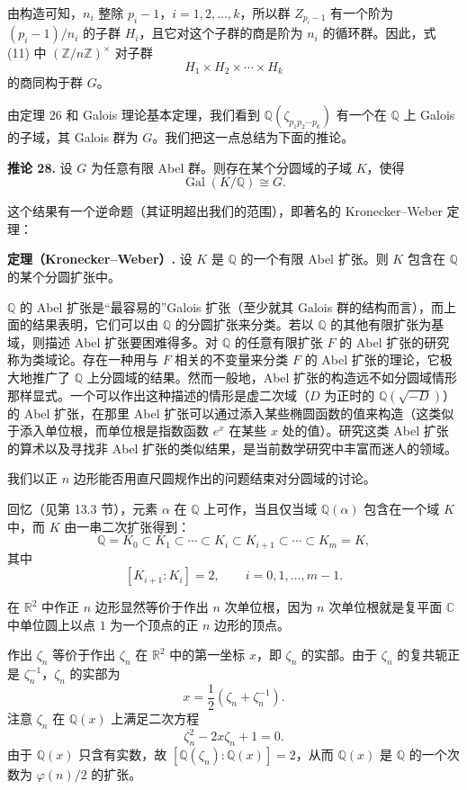 由构造可知，$n_i$ 整除 $p_i-1$，$i=1,2,\ldots,k$，所以群 $Z_{p_i-1}$ 有一个阶为 $(p_i-1)/n_i$ 的子群 $H_i$，且它对这个子群的商是阶为 $n_i$ 的循环群。因此，式 (11) 中 $(\mathbb Z/n\mathbb Z)^\times$ 对子群
\[
H_1\times H_2\times\cdots\times H_k
\]
的商同构于群 $G$。

由定理 26 和 Galois 理论基本定理，我们看到 $\mathbb Q(\zeta_{p_1p_2\cdots p_k})$ 有一个在 $\mathbb Q$ 上 Galois 的子域，其 Galois 群为 $G$。我们把这一点总结为下面的推论。

\noindent\textbf{推论 28.} 设 $G$ 为任意有限 Abel 群。则存在某个分圆域的子域 $K$，使得
\[
\operatorname{Gal}(K/\mathbb Q)\cong G.
\]

这个结果有一个逆命题（其证明超出我们的范围），即著名的 Kronecker--Weber 定理：

\noindent\textbf{定理（Kronecker--Weber）.} 设 $K$ 是 $\mathbb Q$ 的一个有限 Abel 扩张。则 $K$ 包含在 $\mathbb Q$ 的某个分圆扩张中。

$\mathbb Q$ 的 Abel 扩张是“最容易的”Galois 扩张（至少就其 Galois 群的结构而言），而上面的结果表明，它们可以由 $\mathbb Q$ 的分圆扩张来分类。若以 $\mathbb Q$ 的其他有限扩张为基域，则描述 Abel 扩张要困难得多。对 $\mathbb Q$ 的任意有限扩张 $F$ 的 Abel 扩张的研究称为类域论。存在一种用与 $F$ 相关的不变量来分类 $F$ 的 Abel 扩张的理论，它极大地推广了 $\mathbb Q$ 上分圆域的结果。然而一般地，Abel 扩张的构造远不如分圆域情形那样显式。一个可以作出这种描述的情形是虚二次域（$D$ 为正时的 $\mathbb Q(\sqrt{-D})$）的 Abel 扩张，在那里 Abel 扩张可以通过添入某些椭圆函数的值来构造（这类似于添入单位根，而单位根是指数函数 $e^x$ 在某些 $x$ 处的值）。研究这类 Abel 扩张的算术以及寻找非 Abel 扩张的类似结果，是当前数学研究中丰富而迷人的领域。

我们以正 $n$ 边形能否用直尺圆规作出的问题结束对分圆域的讨论。

回忆（见第 13.3 节），元素 $\alpha$ 在 $\mathbb Q$ 上可作，当且仅当域 $\mathbb Q(\alpha)$ 包含在一个域 $K$ 中，而 $K$ 由一串二次扩张得到：
\[
\mathbb Q=K_0\subset K_1\subset\cdots\subset K_i\subset K_{i+1}\subset\cdots\subset K_m=K, \tag{14.12}
\]
其中
\[
[K_{i+1}:K_i]=2,
\qquad i=0,1,\ldots,m-1.
\]

在 $\mathbb R^2$ 中作正 $n$ 边形显然等价于作出 $n$ 次单位根，因为 $n$ 次单位根就是复平面 $\mathbb C$ 中单位圆上以点 $1$ 为一个顶点的正 $n$ 边形的顶点。

作出 $\zeta_n$ 等价于作出 $\zeta_n$ 在 $\mathbb R^2$ 中的第一坐标 $x$，即 $\zeta_n$ 的实部。由于 $\zeta_n$ 的复共轭正是 $\zeta_n^{-1}$，$\zeta_n$ 的实部为
\[
x=\frac12(\zeta_n+\zeta_n^{-1}).
\]
注意 $\zeta_n$ 在 $\mathbb Q(x)$ 上满足二次方程
\[
\zeta_n^2-2x\zeta_n+1=0.
\]
由于 $\mathbb Q(x)$ 只含有实数，故 $[\mathbb Q(\zeta_n):\mathbb Q(x)]=2$，从而 $\mathbb Q(x)$ 是 $\mathbb Q$ 的一个次数为 $\varphi(n)/2$ 的扩张。

